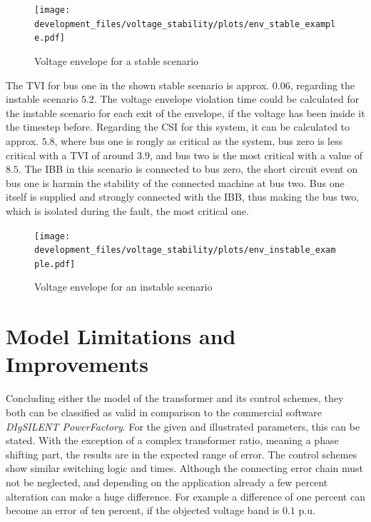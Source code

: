 \begin{figure}[htbp!]
    \centering
    \texttt{[image: development\_files/voltage\_stability/plots/env\_stable\_example.pdf]}
    \caption[Voltage envelope for a stable scenario]{Voltage envelope for a stable scenario}
    \label{fig:env-stable}
\end{figure}

The \acs{TVI} for bus one in the shown stable scenario is approx. $0.06$, regarding the instable scenario $5.2$.
The voltage envelope violation time could be calculated for the instable scenario for each exit of the envelope, if the voltage has been inside it the timestep before.
Regarding the \acs{CSI} for this system, it can be calculated to approx. $5.8$, where bus one is rougly as critical as the system, bus zero is less critical with a \acs{TVI} of around $3.9$, and bus two is the most critical with a value of $8.5$.
The \acs{IBB} in this scenario is connected to bus zero, the short circuit event on bus one is harmin the stability of the connected machine at bus two. 
Bus one itself is supplied and strongly connected with the \acs{IBB}, thus making the bus two, which is isolated during the fault, the most critical one.

\begin{figure}[htbp!]
    \centering
    \texttt{[image: development\_files/voltage\_stability/plots/env\_instable\_example.pdf]}
    \caption[Voltage envelope for an instable scenario]{Voltage envelope for an instable scenario}
    \label{fig:env-instable}
\end{figure}

\section{Model Limitations and Improvements}

Concluding either the model of the transformer and its control schemes, they both can be classified as valid in comparison to the commercial software \textit{DIgSILENT PowerFactory}.
For the given and illustrated parameters, this can be stated.
With the exception of a complex transformer ratio, meaning a phase shifting part, the results are in the expected range of error.
The control schemes show similar switching logic and times.
Although the connecting error chain must not be neglected, and depending on the application already a few percent alteration can make a huge difference.
For example a difference of one percent can become an error of ten percent, if the objected voltage band is $0.1$ p.u.

